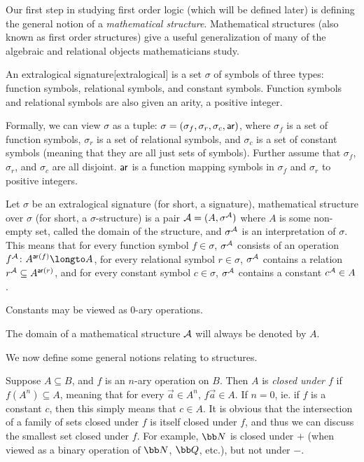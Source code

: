 Our first step in studying first order logic (which will be defined later) is defining the general notion of a {\it mathematical structure}.
Mathematical structures (also known as first order structures) give a useful generalization of many of the algebraic and relational objects mathematicians study.

\bdefn

    An {\emphcolor extralogical signature}[extralogical] is a set $\sigma$ of symbols of three types: function symbols, relational symbols, and constant symbols.
    Function symbols and relational symbols are also given an {\emphcolor arity}, a positive integer.

    Formally, we can view $\sigma$ as a tuple: $\sigma=(\sigma_f,\sigma_r,\sigma_c,{\sf ar})$, where $\sigma_f$ is a set of function symbols, $\sigma_r$ is a set of relational symbols, and $\sigma_c$ is a
    set of constant symbols (meaning that they are all just sets of symbols).
    Further assume that $\sigma_f$, $\sigma_r$, and $\sigma_c$ are all disjoint.
    ${\sf ar}$ is a function mapping symbols in $\sigma_f$ and $\sigma_r$ to positive integers.

\edefn

\bdefn

    Let $\sigma$ be an extralogical signature (for short, a signature), {\emphcolor mathematical structure} over $\sigma$ (for short, a $\sigma$-structure) is a pair
    ${\cal A}=(A,\sigma^{\cal A})$ where $A$ is some non-empty set, called the {\emphcolor domain} of the structure, and $\sigma^{\cal A}$ is an {\emphcolor interpretation} of $\sigma$.
    This means that for every function symbol $f\in\sigma$, $\sigma^{\cal A}$ consists of an operation $f^{\cal A}\colon A^{{\sf ar}(f)}\longto A$, for every relational symbol $r\in\sigma$, $\sigma^{\cal A}$
    contains a relation $r^{\cal A}\subseteq A^{{\sf ar}(r)}$, and for every constant symbol $c\in\sigma$, $\sigma^{\cal A}$ contains a constant $c^{\cal A}\in A$.

    Constants may be viewed as $0$-ary operations.

    The domain of a mathematical structure ${\cal A}$ will always be denoted by $A$.

\edefn

We now define some general notions relating to structures.

Suppose $A\subseteq B$, and $f$ is an $n$-ary operation on $B$.
Then $A$ is {\it closed under $f$} if $f(A^n)\subseteq A$, meaning that for every $\vec a\in A^n$, $f\vec a\in A$.
If $n=0$, ie. if $f$ is a constant $c$, then this simply means that $c\in A$.
It is obvious that the intersection of a family of sets closed under $f$ is itself closed under $f$, and thus we can discuss the smallest set closed under $f$.
For example, ${\bb N}$ is closed under $+$ (when viewed as a binary operation of ${\bb N}$, ${\bb Q}$, etc.), but not under $-$.

